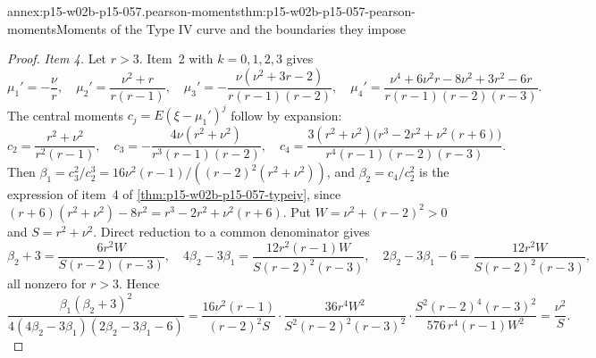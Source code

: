 \begin{annexitem}{annex:p15-w02b-p15-057.pearson-moments}{thm:p15-w02b-p15-057-pearson-moments}{Moments of the Type IV curve and the boundaries they impose}
\begin{proof}
\emph{Item 4.} Let \(r>3\). Item~2 with \(k=0,1,2,3\) gives
\[
 \mu_1'=-\frac\nu r,\quad
 \mu_2'=\frac{\nu^2+r}{r(r-1)},\quad
 \mu_3'=-\frac{\nu(\nu^2+3r-2)}{r(r-1)(r-2)},\quad
 \mu_4'=\frac{\nu^4+6\nu^2r-8\nu^2+3r^2-6r}{r(r-1)(r-2)(r-3)} .
\]
The central moments \(c_j=E(\xi-\mu_1')^j\) follow by expansion:
\[
 c_2=\frac{r^2+\nu^2}{r^2(r-1)},\quad
 c_3=-\frac{4\nu(r^2+\nu^2)}{r^3(r-1)(r-2)},\quad
 c_4=\frac{3(r^2+\nu^2)\bigl(r^3-2r^2+\nu^2(r+6)\bigr)}{r^4(r-1)(r-2)(r-3)} .
\]
Then \(\beta_1=c_3^2/c_2^3=16\nu^2(r-1)/((r-2)^2(r^2+\nu^2))\), and
\(\beta_2=c_4/c_2^2\) is the expression of item~4 of
\cref{thm:p15-w02b-p15-057-typeiv}, since
\((r+6)(r^2+\nu^2)-8r^2=r^3-2r^2+\nu^2(r+6)\). Put
\(W=\nu^2+(r-2)^2>0\) and \(S=r^2+\nu^2\). Direct reduction to a common
denominator gives
\[
 \beta_2+3=\frac{6r^2W}{S(r-2)(r-3)},\quad
 4\beta_2-3\beta_1=\frac{12r^2(r-1)W}{S(r-2)^2(r-3)},\quad
 2\beta_2-3\beta_1-6=\frac{12r^2W}{S(r-2)^2(r-3)},
\]
all nonzero for \(r>3\). Hence
\[
 \frac{\beta_1(\beta_2+3)^2}{4(4\beta_2-3\beta_1)(2\beta_2-3\beta_1-6)}
 =\frac{16\nu^2(r-1)}{(r-2)^2S}\cdot\frac{36r^4W^2}{S^2(r-2)^2(r-3)^2}
 \cdot\frac{S^2(r-2)^4(r-3)^2}{576\,r^4(r-1)W^2}
 =\frac{\nu^2}{S} .
\]
\end{proof}
\end{annexitem}

